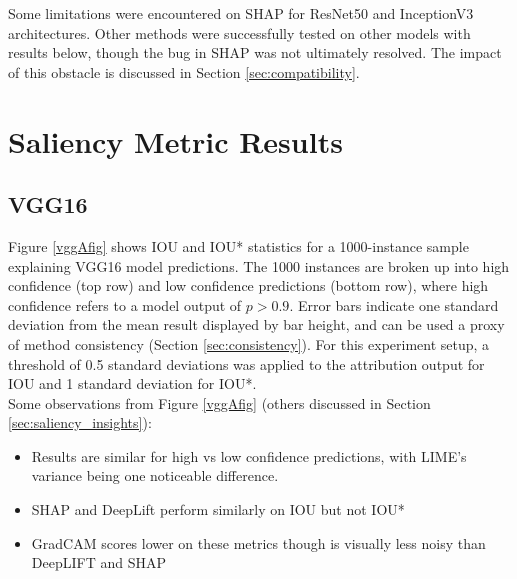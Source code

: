 \documentclass[main]{subfiles}
\begin{document}
Some limitations were encountered on SHAP for ResNet50 and InceptionV3 architectures. Other methods were successfully tested on other models with results below, though the bug in SHAP was not ultimately resolved. The impact of this obstacle is discussed in Section \ref{sec:compatibility}.

\section{Saliency Metric Results}
\subsection{VGG16} \label{sec:vggExp}

Figure \ref{vggAfig} shows IOU and IOU* statistics for a 1000-instance sample explaining VGG16 model predictions. The 1000 instances are broken up into high confidence (top row) and low confidence predictions (bottom row), where high confidence refers to a model output of $p>0.9$. Error bars indicate one standard deviation from the mean result displayed by bar height, and can be used a proxy of method consistency (Section \ref{sec:consistency}). For this experiment setup, a threshold of 0.5 standard deviations was applied to the attribution output for IOU and 1 standard deviation for IOU*.\\

\vspace{0.1in}
\noindent Some observations from Figure \ref{vggAfig} (others discussed in Section \ref{sec:saliency_insights}):
\begin{itemize}
\item Results are similar for high vs low confidence predictions, with LIME's variance being one noticeable difference.
\item SHAP and DeepLift perform similarly on IOU but not IOU*
\item GradCAM scores lower on these metrics though is visually less noisy than DeepLIFT and SHAP
\end{itemize}


\newpage

\end{document}
